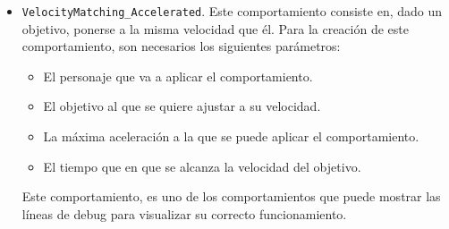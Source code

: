 \begin{itemize}
 
 \item \texttt{VelocityMatching\_Accelerated}. Este comportamiento consiste en, dado un objetivo, ponerse a la misma velocidad que él. Para la creación de este comportamiento, son necesarios los siguientes parámetros:
 \begin{itemize}
  \item El personaje que va a aplicar el comportamiento.
  \item El objetivo al que se quiere ajustar a su velocidad.
  \item La máxima aceleración a la que se puede aplicar el comportamiento.
  \item El tiempo que en que se alcanza la velocidad del objetivo.
 \end{itemize}
 Este comportamiento, es uno de los comportamientos que puede mostrar las líneas de debug para visualizar su correcto funcionamiento. 
\end{itemize}



\medskip
